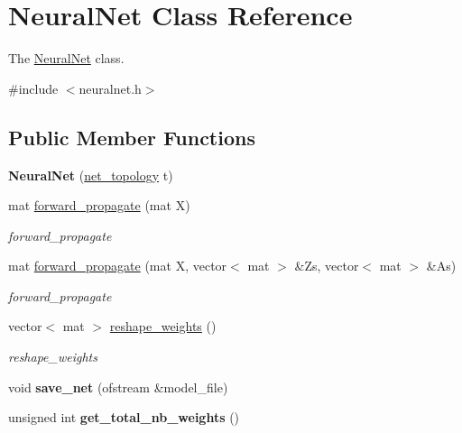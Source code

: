 \hypertarget{classNeuralNet}{\section{Neural\-Net Class Reference}
\label{classNeuralNet}
}


The \hyperlink{classNeuralNet}{Neural\-Net} class.  




{\ttfamily \#include $<$neuralnet.\-h$>$}

\subsection*{Public Member Functions}
\begin{DoxyCompactItemize}
\item 
\hypertarget{classNeuralNet_aea0e1ca0f36640971b2954d135b0a12e}{{\bfseries Neural\-Net} (\hyperlink{structnet__topology}{net\-\_\-topology} t)}\label{classNeuralNet_aea0e1ca0f36640971b2954d135b0a12e}

\item 
mat \hyperlink{classNeuralNet_ab53c509b46f5a901a45be9e4cf77f3bd}{forward\-\_\-propagate} (mat X)
\begin{DoxyCompactList}\small\item\em forward\-\_\-propagate \end{DoxyCompactList}\item 
mat \hyperlink{classNeuralNet_a6a9fdc8fffbd2745d7cca5562912335b}{forward\-\_\-propagate} (mat X, vector$<$ mat $>$ \&Zs, vector$<$ mat $>$ \&As)
\begin{DoxyCompactList}\small\item\em forward\-\_\-propagate \end{DoxyCompactList}\item 
vector$<$ mat $>$ \hyperlink{classNeuralNet_a74dc26bcfbb7a054a8c7697f537a5a99}{reshape\-\_\-weights} ()
\begin{DoxyCompactList}\small\item\em reshape\-\_\-weights \end{DoxyCompactList}\item 
\hypertarget{classNeuralNet_aefd889aaa736267ae67bd2beb0275628}{void {\bfseries save\-\_\-net} (ofstream \&model\-\_\-file)}\label{classNeuralNet_aefd889aaa736267ae67bd2beb0275628}

\item 
\hypertarget{classNeuralNet_a2e458054a038980589c2c4a97e647709}{unsigned int {\bfseries get\-\_\-total\-\_\-nb\-\_\-weights} ()}\label{classNeuralNet_a2e458054a038980589c2c4a97e647709}


\end{DoxyCompactItemize}
